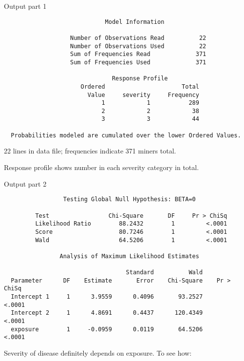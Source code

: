 \documentclass[pdf]{prosper}
\begin{document}
\begin{slide}{Output part 1}

{\scriptsize
\begin{verbatim}
                             Model Information

                   Number of Observations Read          22
                   Number of Observations Used          22
                   Sum of Frequencies Read             371
                   Sum of Frequencies Used             371

                               Response Profile
                      Ordered                      Total
                        Value     severity     Frequency
                            1            1           289
                            2            2            38
                            3            3            44

  Probabilities modeled are cumulated over the lower Ordered Values.
\end{verbatim}
}

\vspace{2ex}

22 lines in data file; frequencies indicate 371 miners total. 

\vspace{2ex}

Response profile shows number in each severity category in total.
  
\end{slide}

\begin{slide}{Output part 2}

{\scriptsize
\begin{verbatim}
                 Testing Global Null Hypothesis: BETA=0

         Test                 Chi-Square       DF     Pr > ChiSq
         Likelihood Ratio        88.2432        1         <.0001
         Score                   80.7246        1         <.0001  
         Wald                    64.5206        1         <.0001

                Analysis of Maximum Likelihood Estimates

                                   Standard          Wald
  Parameter      DF    Estimate       Error    Chi-Square    Pr > ChiSq
  Intercept 1     1      3.9559      0.4096       93.2527        <.0001
  Intercept 2     1      4.8691      0.4437      120.4349        <.0001
  exposure        1     -0.0959      0.0119       64.5206        <.0001
\end{verbatim}
}

\vspace{3ex}

Severity of disease definitely depends on exposure. To see how:

\end{slide}
\end{document}
